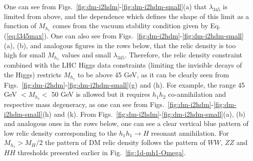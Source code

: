 \documentclass[12pt,a4paper]{article}
\begin{document}



One can see from Figs.~\ref{fig:dm-i2hdm}-\ref{fig:dm-i2hdm-small}(a) that $\lambda_{345}$ is limited from above,
and the dependence which defines the  shape of this limit as a function of $M_{h_1}$ comes from 
the vacuum stability condition given by Eq.(\ref{eq:l345max}). One can also see from
Figs.~\ref{fig:dm-i2hdm}-\ref{fig:dm-i2hdm-small}(a), (b), and analogous figures in the rows below, that the relic density
is too high for small $M_{h_1}$ values and small $\lambda_{345}$.
Therefore, the relic density
constraint combined with the LHC Higgs data constraints (limiting the invisible decays of the Higgs) restricts $M_{h_1}$ to be above 45 GeV,
as it can be clearly seen from 
Figs.~\ref{fig:dm-i2hdm}-\ref{fig:dm-i2hdm-small}(g) and (h).
For example, the range 45 GeV $<M_{h_1}<$ 50 GeV is allowed but it requires $h_1h_2$ co-annihilation
and respective mass degeneracy, as one can see from Figs.~\ref{fig:dm-i2hdm}-\ref{fig:dm-i2hdm-small}(h) and (k). From
Figs.~\ref{fig:dm-i2hdm}-\ref{fig:dm-i2hdm-small}(a), (b) and analogous ones in the rows below, one can see a clear vertical blue
pattern of low relic density corresponding to the $h_1 h_1 \to H$ resonant annihilation.  For $M_{h_1}>M_H/2$
the pattern of DM relic density follows the pattern of  $WW$, $ZZ$ and $HH$ thresholds 
presented earlier in Fig.~\ref{fig:1d-mh1-Omega}.
\end{document}
